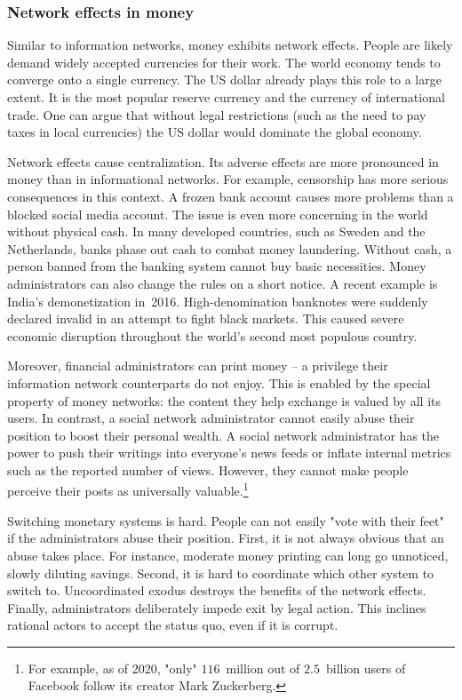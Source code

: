 \subsubsection*{Network effects in money}

Similar to information networks, money exhibits network effects.
People are likely demand widely accepted currencies for their work.
The world economy tends to converge onto a single currency.
The US dollar already plays this role to a large extent.
It is the most popular reserve currency and the currency of international trade.
One can argue that without legal restrictions (such as the need to pay taxes in local currencies) the US dollar would dominate the global economy.

Network effects cause centralization.
Its adverse effects are more pronounced in money than in informational networks.
For example, censorship has more serious consequences in this context.
A frozen bank account causes more problems than a blocked social media account.
The issue is even more concerning in the world without physical cash.
In many developed countries, such as Sweden and the Netherlands, banks phase out cash to combat money laundering.
Without cash, a person banned from the banking system cannot buy basic necessities.
Money administrators can also change the rules on a short notice.
A recent example is India's demonetization in~2016.
High-denomination banknotes were suddenly declared invalid in an attempt to fight black markets.
This caused severe economic disruption throughout the world's second most populous country.

Moreover, financial administrators can print money -- a privilege their information network counterparts do not enjoy.
This is enabled by the special property of money networks: the content they help exchange is valued by all its users.
In contrast, a social network administrator cannot easily abuse their position to boost their personal wealth.
A social network administrator has the power to push their writings into everyone's news feeds or inflate internal metrics such as the reported number of views.
However, they cannot make people perceive their posts as universally valuable.\footnote{For example, as of 2020, "only" $116$~million out of $2.5$~billion users of Facebook follow its creator Mark Zuckerberg.}

Switching monetary systems is hard.
People can not easily "vote with their feet" if the administrators abuse their position.
First, it is not always obvious that an abuse takes place.
For instance, moderate money printing can long go unnoticed, slowly diluting savings.
Second, it is hard to coordinate which other system to switch to.
Uncoordinated exodus destroys the benefits of the network effects.
Finally, administrators deliberately impede exit by legal action.
This inclines rational actors to accept the status quo, even if it is corrupt.

